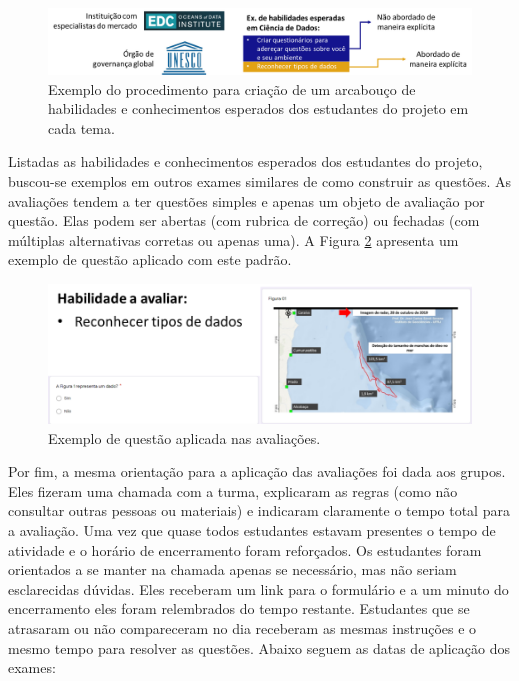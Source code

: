 \documentclass[
]{book}
\begin{document}
\begin{figure}

{\centering \includegraphics[width=1\linewidth,height=0.8\textheight]{images/Impactos/02} 

}

\caption{Exemplo do procedimento para criação de um arcabouço de habilidades e conhecimentos esperados dos estudantes do projeto em cada tema.}\label{fig:impacto02}
\end{figure}

Listadas as habilidades e conhecimentos esperados dos estudantes do projeto, buscou-se exemplos em outros exames similares de como construir as questões. As avaliações tendem a ter questões simples e apenas um objeto de avaliação por questão. Elas podem ser abertas (com rubrica de correção) ou fechadas (com múltiplas alternativas corretas ou apenas uma). A Figura \ref{fig:impacto03} apresenta um exemplo de questão aplicado com este padrão.

\begin{figure}

{\centering \includegraphics[width=1\linewidth,height=0.8\textheight]{images/Impactos/03} 

}

\caption{Exemplo de questão aplicada nas avaliações.}\label{fig:impacto03}
\end{figure}

Por fim, a mesma orientação para a aplicação das avaliações foi dada aos grupos. Eles fizeram uma chamada com a turma, explicaram as regras (como não consultar outras pessoas ou materiais) e indicaram claramente o tempo total para a avaliação. Uma vez que quase todos estudantes estavam presentes o tempo de atividade e o horário de encerramento foram reforçados. Os estudantes foram orientados a se manter na chamada apenas se necessário, mas não seriam esclarecidas dúvidas. Eles receberam um link para o formulário e a um minuto do encerramento eles foram relembrados do tempo restante. Estudantes que se atrasaram ou não compareceram no dia receberam as mesmas instruções e o mesmo tempo para resolver as questões. Abaixo seguem as datas de aplicação dos exames:
\end{document}
